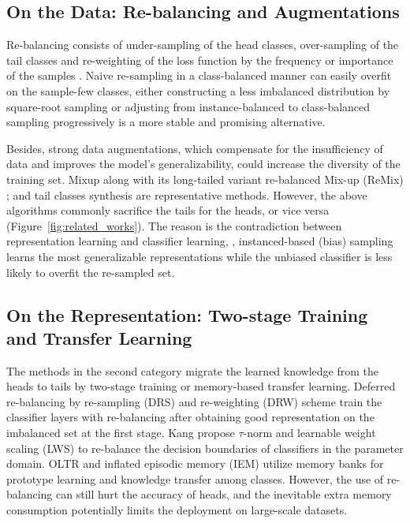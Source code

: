 \subsection{On the Data: Re-balancing and Augmentations}
\label{sec:rebalancing}
Re-balancing consists of under-sampling of the head classes, over-sampling of the tail classes and re-weighting of the loss function by the frequency or importance of the samples \cite{japkowicz2002class, lin2017focal, cui2019class, cao2019learning}. Naive re-sampling in a class-balanced manner \cite{Huang_2016_CVPR,wang2017learning} can easily overfit on the sample-few classes, either constructing a less imbalanced distribution by square-root sampling \cite{mikolov2013distributed} or adjusting from instance-balanced to class-balanced sampling progressively \cite{cao2019learning, cui2019class, zhou2020bbn} is a more stable and promising alternative. 

Besides, strong data augmentations, which compensate for the insufficiency of data and improves the model's generalizability, could increase the diversity of the training set. Mixup \cite{zhang2017mixup} along with its long-tailed variant re-balanced Mix-up (ReMix) \cite{chou2020remix}; and tail classes synthesis \cite{zhang2021bag} are representative methods. However, the above algorithms commonly sacrifice the tails for the heads, or vice versa (Figure~\ref{fig:related_works}). The reason is the contradiction between representation learning and classifier learning, \ie, instanced-based (bias) sampling learns the most generalizable representations while the unbiased classifier is less likely to overfit the re-sampled set.

\subsection{On the Representation: Two-stage Training and Transfer Learning} 
The methods in the second category migrate the learned knowledge from the heads to tails by two-stage training or memory-based transfer learning. Deferred re-balancing by re-sampling (DRS) and re-weighting (DRW) scheme \cite{cao2019learning} train the classifier layers with re-balancing after obtaining good representation on the imbalanced set at the first stage. Kang \etal \cite{kang2019decoupling} propose $\tau$-norm and learnable weight scaling (LWS) to re-balance the decision boundaries of classifiers in the parameter domain. OLTR \cite{liu2019large} and inflated episodic memory (IEM) \cite{zhu2020inflated} utilize memory banks for prototype learning and knowledge transfer among classes. However, the use of re-balancing can still hurt the accuracy of heads, and the inevitable extra memory consumption potentially limits the deployment on large-scale datasets.

